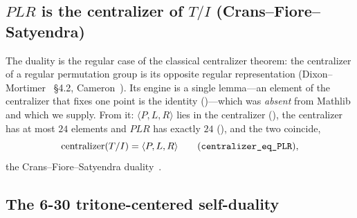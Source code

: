 \subsection{$PLR$ is the centralizer of $T/I$ (Crans--Fiore--Satyendra)}\label{sec:p2-cfs}


The duality is the regular case of the classical centralizer theorem: the centralizer of a regular
permutation group is its opposite regular representation (Dixon--Mortimer~\cite{DM} \S4.2,
Cameron~\cite{Cam}). Its engine is a single lemma---an element of the centralizer that fixes one
point is the identity ()---which was \emph{absent} from
Mathlib and which we supply. From it: $\langle P,L,R\rangle$ lies in the centralizer
(), the centralizer has at most $24$ elements and $PLR$ has exactly $24$
(), and the two coincide,
\[
  \mathrm{centralizer}(T/I)=\langle P,L,R\rangle\qquad(\texttt{centralizer\_eq\_PLR}),
\]
the Crans--Fiore--Satyendra duality~\cite{CFS}.

\subsection{The 6-30 tritone-centered self-duality}\label{sec:p2-sixthirty}


